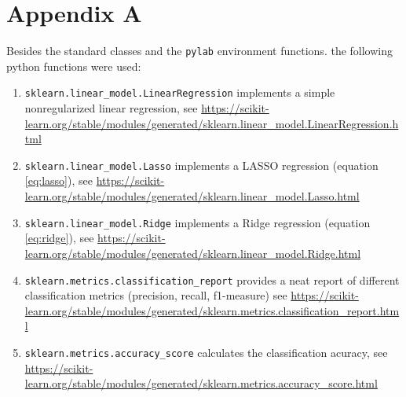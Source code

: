 \documentclass{article}
\begin{document}
\section{Appendix A}
Besides the standard classes and the \texttt{pylab} environment functions. the following python functions were used:
\begin{enumerate}
    \item \texttt{sklearn.linear\_model.LinearRegression} implements a simple nonregularized linear regression, see \url{https://scikit-learn.org/stable/modules/generated/sklearn.linear_model.LinearRegression.html}
    \item \texttt{sklearn.linear\_model.Lasso} implements a LASSO regression (equation \ref{eq:lasso}), see \url{https://scikit-learn.org/stable/modules/generated/sklearn.linear_model.Lasso.html}
    \item \texttt{sklearn.linear\_model.Ridge} implements a Ridge regression (equation \ref{eq:ridge}), see \url{https://scikit-learn.org/stable/modules/generated/sklearn.linear_model.Ridge.html}
    \item \texttt{sklearn.metrics.classification\_report} provides a neat report of different classification metrics (precision, recall, f1-measure) see \url{https://scikit-learn.org/stable/modules/generated/sklearn.metrics.classification_report.html}
    \item \texttt{sklearn.metrics.accuracy\_score} calculates the classification acuracy, see \url{https://scikit-learn.org/stable/modules/generated/sklearn.metrics.accuracy_score.html}
\end{enumerate}
\end{document}
